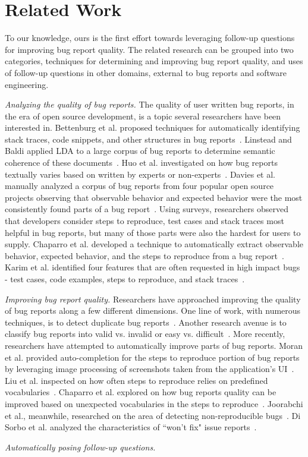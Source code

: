 \section{Related Work}
To our knowledge, ours is the first effort towards leveraging follow-up questions for
improving bug report quality. The related research can be grouped into two categories, techniques
for determining and improving bug report quality, and uses of follow-up questions in other domains,
external to bug reports and software engineering.

\noindent
{\em Analyzing the quality of bug reports.} The quality of user written bug reports, in the era of open source development, is a topic several researchers have been interested in. Bettenburg et al. proposed techniques for automatically identifying stack traces, code snippets, and other structures in bug reports~\cite{bettenburg08extracting}. Linstead and Baldi applied LDA to a large corpus of bug reports to determine semantic coherence of these documents~\cite{linstead09mining}. Huo et al. investigated on how bug reports textually varies based on written by experts or non-experts~\cite{Huo2014AnES}. Davies et al. manually analyzed a corpus of bug reports from four popular open source projects observing that observable behavior and expected behavior were the most consistently found parts of a bug report~\cite{davies14whats}. Using surveys, researchers observed that developers consider steps to reproduce, test cases and stack traces most helpful in bug reports, but many of those parts were also the hardest for users to supply. Chaparro et al. developed a technique to automatically extract observable behavior, expected behavior, and the steps to reproduce from a bug report~\cite{chaparro17detecting}. Karim et al. identified four features that are often requested in high impact bugs - test cases, code examples, steps to reproduce, and stack traces~\cite{Karim2017UnderstandingKF}.

\noindent
{\em Improving bug report quality.} Researchers have approached improving the quality of bug reports along a few different dimensions. One line of work, with numerous techniques, is to detect duplicate bug reports~\cite{chaparro19reformulating}. Another research avenue is to classify bug reports into valid vs. invalid or easy vs. difficult~\cite{fan20chaff,hooimeijer07modeling}. More recently, researchers have attempted to automatically improve parts of bug reports. Moran et al. provided auto-completion for the steps to reproduce portion of bug reports by leveraging image processing of screenshots taken from the application's UI~\cite{moran15autocompleting}. Liu et al. inspected on how often steps to reproduce relies on predefined vocabularies~\cite{liu2020automated}. Chaparro et al. explored on how bug reports quality can be improved based on unexpected vocabularies in the steps to reproduce~\cite{Chaparro2019AssessingTQ}. Joorabchi et al., meanwhile, researched on the area of detecting non-reproducible bugs~\cite{erfani2014works}. Di Sorbo et al. analyzed the characteristics of ``won't fix" issue reports~\cite{Sorbo2019WontWF}.

\noindent
{\em Automatically posing follow-up questions.} 
